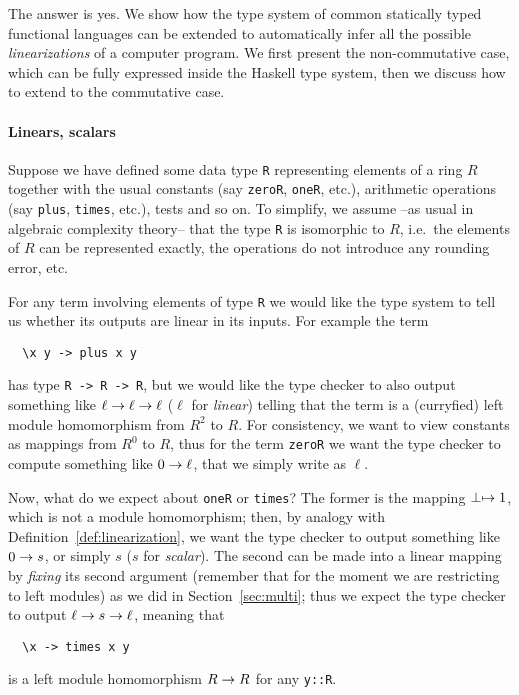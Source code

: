 The answer is yes. We show how the type system of common statically
typed functional languages can be extended to automatically infer all
the possible \emph{linearizations} of a computer
program. We first present the non-commutative case, which can be fully
expressed inside the Haskell type system, then we discuss how to
extend to the commutative case.

\paragraph{Linears, scalars}
\label{sec:linears-scalars}
Suppose we have defined some data type \lstinline{R} representing
elements of a ring $R$ together with the usual constants (say
\lstinline{zeroR}, \lstinline{oneR}, etc.), arithmetic operations (say
\lstinline{plus}, \lstinline{times}, etc.), tests and so on. To
simplify, we assume --as usual in algebraic complexity theory-- that
the type \lstinline{R} is isomorphic to $R$, i.e.\ the elements of $R$
can be represented exactly, the operations do not introduce any
rounding error, etc.

For any term involving elements of type \lstinline{R} we would like
the type system to tell us whether its outputs are linear in its
inputs. For example the term
\begin{lstlisting}
  \x y -> plus x y
\end{lstlisting}
has type \lstinline{R -> R -> R}, but we would like the type checker
to also output something like $\ell\rightarrow\ell\rightarrow\ell$ ($\ell$ for
\emph{linear}) telling that the term is a
(curryfied) left module homomorphism from $R^2$ to $R$. For
consistency, we want to view constants as mappings from $R^0$ to $R$,
thus for the term \lstinline{zeroR} we want the type checker to
compute something like $0\rightarrow\ell$, that we simply write as $\ell$.

Now, what do we expect about \lstinline{oneR} or \lstinline{times}?
The former is the mapping $\perp\mapsto1$, which is not a module
homomorphism; then, by analogy with
Definition~\ref{def:linearization}, we want the type checker to output
something like $0\rightarrow s$, or simply $s$ ($s$ for
\emph{scalar}). The second can be made into a
linear mapping by \emph{fixing} its second argument (remember that for
the moment we are restricting to left modules) as we did in
Section~\ref{sec:multi}; thus we expect the type checker to output
$\ell\rightarrow s\rightarrow\ell$, meaning that
\begin{lstlisting}
  \x -> times x y
\end{lstlisting}
is a left module homomorphism $R\rightarrow R$ for any \lstinline{y::R}.

